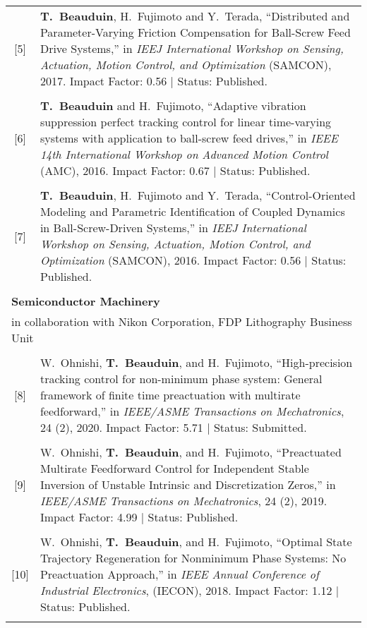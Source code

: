 \documentclass[a4paper,10pt]{article}
\begin{document}
\begin{tabularx}{\textwidth}{cX}
[5] & \textbf{T.~Beauduin}, H.~Fujimoto and Y.~Terada, ``{Distributed and Parameter-Varying Friction 
	Compensation for Ball-Screw Feed Drive Systems},'' in \emph{IEEJ International Workshop on 
	Sensing, Actuation, Motion Control, and Optimization} (SAMCON), 2017. 
	Impact Factor: 0.56 | Status: Published. \\
& \\

[6] & \textbf{T.~Beauduin} and H.~Fujimoto, ``{Adaptive vibration suppression perfect tracking 
	control for linear time-varying systems with application to ball-screw feed drives},'' 
	in \emph{IEEE 14th International Workshop on Advanced Motion Control} (AMC), 2016. 
	Impact Factor: 0.67 | Status: Published. \\
	& \\

[7] & \textbf{T.~Beauduin}, H.~Fujimoto and Y.~Terada, ``{Control-Oriented Modeling and Parametric 
	Identification of Coupled Dynamics in Ball-Screw-Driven Systems},'' 
	in \emph{IEEJ International Workshop on Sensing, Actuation, Motion Control, and Optimization} (SAMCON), 2016. 
	Impact Factor: 0.56 | Status: Published. \\
& \\

\multicolumn{2}{l}{\textbf{Semiconductor Machinery}} \\
\multicolumn{2}{l}{in collaboration with Nikon Corporation, FDP Lithography Business Unit} \\
&\\

[8] & W.~Ohnishi, \textbf{T.~Beauduin}, and H.~Fujimoto, ``{High-precision tracking control for 
	non-minimum phase system: General framework of finite time preactuation with multirate feedforward},'' 
	in \emph{IEEE/ASME Transactions on Mechatronics}, 24 (2), 2020. 
	Impact Factor: 5.71 | Status: Submitted. \\
	& \\

[9] & W.~Ohnishi, \textbf{T.~Beauduin}, and H.~Fujimoto, ``{Preactuated Multirate Feedforward Control 
	for Independent Stable Inversion of Unstable Intrinsic and Discretization Zeros},'' 
	in \emph{IEEE/ASME Transactions on Mechatronics}, 24 (2), 2019. 
	Impact Factor: 4.99 | Status: Published. \\
	& \\

[10] & W.~Ohnishi, \textbf{T.~Beauduin}, and H.~Fujimoto, ``{Optimal State Trajectory Regeneration 
	for Nonminimum Phase Systems: No Preactuation Approach},'' in \emph{IEEE Annual Conference of 
	Industrial Electronics}, (IECON), 2018.
	Impact Factor: 1.12 | Status: Published. \\
	& \\
	

\end{tabularx}
\end{document}
